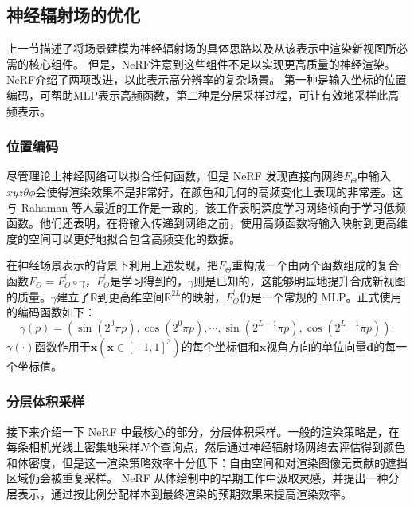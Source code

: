 \subsection{神经辐射场的优化}
上一节描述了将场景建模为神经辐射场的具体思路以及从该表示中渲染新视图所必需的核心组件。 但是，NeRF注意到这些组件不足以实现更高质量的神经渲染。NeRF介绍了两项改进，以此表示高分辨率的复杂场景。 第一种是输入坐标的位置编码，可帮助MLP表示高频函数，第二种是分层采样过程，可让有效地采样此高频表示。

\subsubsection{位置编码}
尽管理论上神经网络可以拟合任何函数，但是 NeRF 发现直接向网络$\displaystyle F_{\Theta}$中输入$\displaystyle xyz\theta\phi$会使得渲染效果不是非常好，在颜色和几何的高频变化上表现的非常差。这与 Rahaman 等人\cite{rahaman2019spectral}最近的工作是一致的，该工作表明深度学习网络倾向于学习低频函数。他们还表明，在将输入传递到网络之前，使用高频函数将输入映射到更高维度的空间可以更好地拟合包含高频变化的数据。

在神经场景表示的背景下利用上述发现，把$\displaystyle F_{\Theta}$重构成一个由两个函数组成的复合函数$\displaystyle F_{\Theta} = F_{\Theta}^{\prime} \circ \gamma$，$\displaystyle F_{\Theta}^{\prime}$是学习得到的，$\displaystyle \gamma$则是已知的，这能够明显地提升合成新视图的质量。$\displaystyle \gamma$建立了$\displaystyle \mathbb{R}$到更高维空间$\displaystyle \mathbb{R}^{2L}$的映射，$\displaystyle F_{\Theta}^{\prime}$仍是一个常规的 MLP。正式使用的编码函数如下：
\begin{equation}
    \gamma\left(p\right) = \left(\sin\left(2^{0}\pi p\right), \cos\left(2^{0}\pi p\right), \cdots, \sin\left(2^{L - 1}\pi p\right), \cos\left(2^{L - 1}\pi p\right)\right).
\end{equation}
$\displaystyle \gamma\left(\cdot\right)$函数作用于$\symbf{x}\left(\symbf{x} \in \left[-1, 1\right]^{3}\right)$的每个坐标值和$\displaystyle \symbf{x}$视角方向的单位向量$\displaystyle \symbf{d}$的每一个坐标值。

\subsubsection{分层体积采样}
接下来介绍一下 NeRF 中最核心的部分，分层体积采样。一般的渲染策略是，在每条相机光线上密集地采样$N$个查询点，然后通过神经辐射场网络去评估得到颜色和体密度，但是这一渲染策略效率十分低下：自由空间和对渲染图像无贡献的遮挡区域仍会被重复采样。 NeRF 从体绘制中的早期工作\cite{levoy1990efficient}中汲取灵感，并提出一种分层表示，通过按比例分配样本到最终渲染的预期效果来提高渲染效率。

